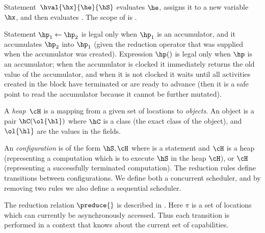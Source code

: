 Statement~$\hval{\hx}{\he}{\hS}$ evaluates $\he$, assigns it to a
new variable $\hx$, and then evaluates \hS. The scope of \hx{} is \hS.

Statement $\hp_1 \leftarrow \hp_2$ is legal only when $\hp_1$ is an accumulator,
    and it accumulates $\hp_2$ into $\hp_1$ (given the reduction operator that was supplied when the accumulator was created).
Expression $\hp()$ is legal only when $\hp$ is an accumulator;
    when the accumulator is clocked it immediately returns the old value of the accumulator,
    and when it is not clocked it waits until all activities created in the block have terminated or are ready to advance
    (then it is a safe point to read the accumulator because it cannot be further mutated).


A {\em heap}~$\cH$ is a mapping from a given set of locations to {\em
  objects}. An object is a pair $\hC(\ol{\hl})$ where $\hC$ is a class (the exact
class of the object), and $\ol{\hl}$ are the values in the fields.

An {\em configuration} is of the form
$\hS,\cH$ where \hS{} is a statement and $\cH$ is a heap (representing a
computation which is to execute $\hS$ in the heap $\cH$), or $\cH$
(representing a successfully terminated computation).
The reduction rules define transitions between configurations.
We define both a concurrent scheduler, and by removing two rules we also define a sequential scheduler.

The reduction relation $\preduce{}$ is described in
    .
Here $\pi$ is a
set of locations which can currently be asynchronously accessed.  Thus
each transition is performed in a context that knows about the current
set of capabilities.

